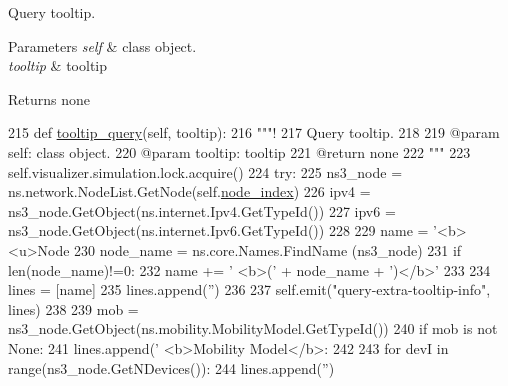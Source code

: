 Query tooltip. 


\begin{DoxyParams}{Parameters}
{\em self} & class object. \\
\hline
{\em tooltip} & tooltip \\
\hline
\end{DoxyParams}
\begin{DoxyReturn}{Returns}
none 
\end{DoxyReturn}

\begin{DoxyCode}
215     \textcolor{keyword}{def }\hyperlink{classvisualizer_1_1core_1_1Node_adc2fb79db11c7bc14798dd8459400950}{tooltip\_query}(self, tooltip):
216         \textcolor{stringliteral}{"""!}
217 \textcolor{stringliteral}{        Query tooltip.}
218 \textcolor{stringliteral}{}
219 \textcolor{stringliteral}{        @param self: class object.}
220 \textcolor{stringliteral}{        @param tooltip: tooltip}
221 \textcolor{stringliteral}{        @return none}
222 \textcolor{stringliteral}{        """}
223         self.visualizer.simulation.lock.acquire()
224         \textcolor{keywordflow}{try}:
225             ns3\_node = ns.network.NodeList.GetNode(self.\hyperlink{classvisualizer_1_1core_1_1Node_aea81fec6a912dca8f7c389ed7cb37008}{node\_index})
226             ipv4 = ns3\_node.GetObject(ns.internet.Ipv4.GetTypeId())
227             ipv6 = ns3\_node.GetObject(ns.internet.Ipv6.GetTypeId())
228         
229             name = \textcolor{stringliteral}{'<b><u>Node %
230             node\_name = ns.core.Names.FindName (ns3\_node)
231             \textcolor{keywordflow}{if} len(node\_name)!=0:
232                 name += \textcolor{stringliteral}{' <b>('} + node\_name + \textcolor{stringliteral}{')</b>'}
233 
234             lines = [name]
235             lines.append(\textcolor{stringliteral}{''})
236 
237             self.emit(\textcolor{stringliteral}{"query-extra-tooltip-info"}, lines)
238 
239             mob = ns3\_node.GetObject(ns.mobility.MobilityModel.GetTypeId())
240             \textcolor{keywordflow}{if} mob \textcolor{keywordflow}{is} \textcolor{keywordflow}{not} \textcolor{keywordtype}{None}:
241                 lines.append(\textcolor{stringliteral}{'  <b>Mobility Model</b>: %
242 
243             \textcolor{keywordflow}{for} devI \textcolor{keywordflow}{in} range(ns3\_node.GetNDevices()):
244                 lines.append(\textcolor{stringliteral}{''})
}}
\end{DoxyCode}
